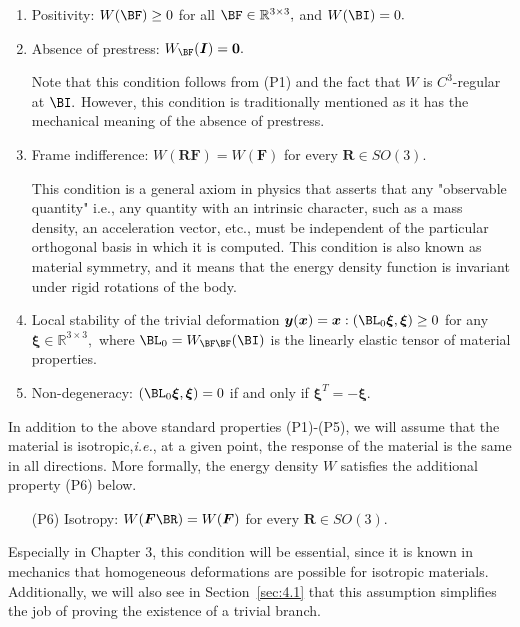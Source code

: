 \begin{enumerate}[label={(P\arabic*)}]
    \item Positivity: $W(\BF)\geq 0$ for all $\BF\in\mathbb R^{3\times 3},$ and $W(\BI)=0.$
    \item Absence of prestress: $W_{\BF}(\boldsymbol{I})=\mathbf{0}.$
        
        Note that this condition follows from (P1) and the fact that $W$ is $C^3$-regular at $\BI.$ However, this condition is traditionally mentioned as it has the mechanical meaning of the absence of prestress. 
    \item Frame indifference: $W( \boldsymbol{R}\boldsymbol{F})=W(\boldsymbol{F})$ for every $\boldsymbol{R} \in S O(3).$
     
    This condition is a general axiom in physics that asserts that any "observable quantity" i.e.,
    any quantity with an intrinsic character, such as a mass density, an acceleration vector, etc., must be independent of the particular orthogonal basis in which it is computed.
    This condition is also known as material symmetry, and it means that the energy density function is invariant under rigid rotations of the body.
    \item Local stability of the trivial deformation $\boldsymbol{y}(\boldsymbol{x})=\boldsymbol{x}:\left(\BL_{0} \boldsymbol{\xi}, \boldsymbol{\xi}\right) \geq 0$ for any 
    $\boldsymbol{\xi} \in \mathbb{R}^{3 \times 3},$ where $\BL_{0}=W_{\BF\BF}(\BI)$ is the linearly elastic tensor of material properties.
    \item Non-degeneracy: $\left(\BL_{0} \boldsymbol{\xi}, \boldsymbol{\xi}\right)=0$ if and only if $\boldsymbol{\xi}^{T}=-\boldsymbol{\xi}$.
\end{enumerate}
In addition to the above standard properties (P1)-(P5), we will assume that the material is isotropic,\textit{i.e.}, at a given point, the response of the material is the same in all directions. More formally,  the energy density $W$ satisfies the additional property (P6) below.
\begin{itemize}
    \item[(P6)] Isotropy: $W(\boldsymbol{F}\BR)=W(\boldsymbol{F})$ for every $\boldsymbol{R} \in S O(3).$    
\end{itemize}
Especially in Chapter 3, this condition will be essential, since it is known in mechanics that homogeneous deformations are possible for isotropic materials. Additionally, we will also see in Section~\ref{sec:4.1} that this assumption simplifies the job of proving the existence of a trivial branch.


